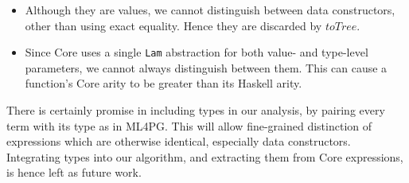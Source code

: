\begin{itemize}
  \item Although they are values, we cannot distinguish between data constructors, other than using exact equality. Hence they are discarded by $toTree$.
  \item Since Core uses a single \texttt{Lam} abstraction for both value- and type-level parameters, we cannot always distinguish between them. This can cause a function's Core arity to be greater than its Haskell arity.
\end{itemize}

There is certainly promise in including types in our analysis, by pairing every term with its type as in ML4PG. This will allow fine-grained distinction of expressions which are otherwise identical, especially data constructors. Integrating types into our algorithm, and extracting them from Core expressions, is hence left as future work.
